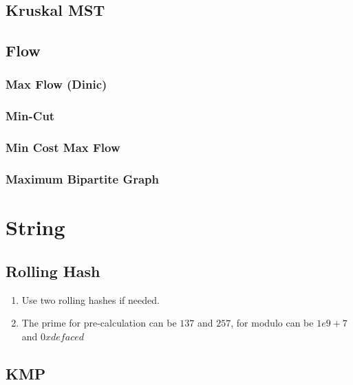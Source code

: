 \documentclass[10pt,oneside]{article}
\begin{document}
\begin{landscape}
\begin{multicols}{2}
\subsection{Kruskal MST}

\subsection{Flow}

\subsubsection{Max Flow (Dinic)}

\subsubsection{Min-Cut}

\subsubsection{Min Cost Max Flow}

\subsubsection{Maximum Bipartite Graph}


\section{String}

\subsection{Rolling Hash}

\begin{enumerate}
	\item Use two rolling hashes if needed.  
	\item The prime for pre-calculation can be $137$ and $257$, for modulo can be $1e9 + 7$ and $0xdefaced$ 
\end{enumerate}



\subsection{KMP}




\end{multicols}
\end{landscape}
\end{document}
